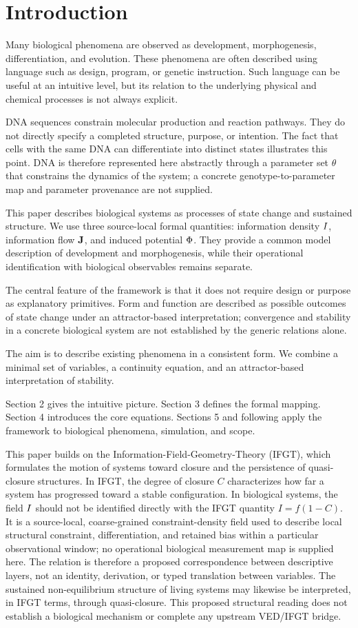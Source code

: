 \section{Introduction}

Many biological phenomena are observed as development, morphogenesis, differentiation, and evolution. These phenomena are often described using language such as design, program, or genetic instruction. Such language can be useful at an intuitive level, but its relation to the underlying physical and chemical processes is not always explicit.

DNA sequences constrain molecular production and reaction pathways. They do not directly specify a completed structure, purpose, or intention. The fact that cells with the same DNA can differentiate into distinct states illustrates this point. DNA is therefore represented here abstractly through a parameter set \(\theta\) that constrains the dynamics of the system; a concrete genotype-to-parameter map and parameter provenance are not supplied.

This paper describes biological systems as processes of state change and sustained structure. We use three source-local formal quantities: information density \(I\), information flow \(\mathbf{J}\), and induced potential \(\Phi\). They provide a common model description of development and morphogenesis, while their operational identification with biological observables remains separate.

The central feature of the framework is that it does not require design or purpose as explanatory primitives. Form and function are described as possible outcomes of state change under an attractor-based interpretation; convergence and stability in a concrete biological system are not established by the generic relations alone.

The aim is to describe existing phenomena in a consistent form. We combine a minimal set of variables, a continuity equation, and an attractor-based interpretation of stability.

Section 2 gives the intuitive picture. Section 3 defines the formal mapping. Section 4 introduces the core equations. Sections 5 and following apply the framework to biological phenomena, simulation, and scope.

This paper builds on the Information-Field-Geometry-Theory (IFGT), which formulates the motion of systems toward closure and the persistence of quasi-closure structures. In IFGT, the degree of closure \(C\) characterizes how far a system has progressed toward a stable configuration. In biological systems, the field \(I\) should not be identified directly with the IFGT quantity \(I=f(1-C)\). It is a source-local, coarse-grained constraint-density field used to describe local structural constraint, differentiation, and retained bias within a particular observational window; no operational biological measurement map is supplied here. The relation is therefore a proposed correspondence between descriptive layers, not an identity, derivation, or typed translation between variables. The sustained non-equilibrium structure of living systems may likewise be interpreted, in IFGT terms, through quasi-closure. This proposed structural reading does not establish a biological mechanism or complete any upstream VED/IFGT bridge.
